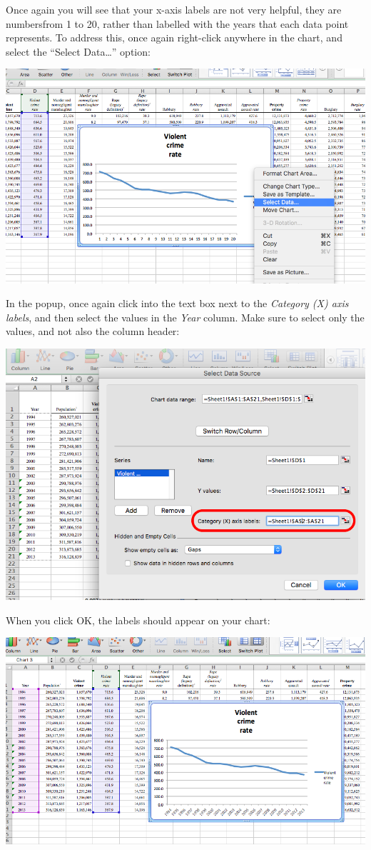 \documentclass[]{book}
\theoremstyle{definition}
\theoremstyle{definition}
\theoremstyle{definition}
\theoremstyle{remark}
\begin{document}
Once again you will see that your x-axis labels are not very helpful,
they are numbersfrom 1 to 20, rather than labelled with the years that
each data point represents. To address this, once again right-click
anywhere in the chart, and select the ``Select Data\ldots{}'' option:

\includegraphics{imgs/desc_line_2.png}

In the popup, once again click into the text box next to the
\emph{Category (X) axis labels}, and then select the values in the
\emph{Year} column. Make sure to select only the values, and not also
the column header:

\includegraphics{imgs/desc_viz_4.png}

When you click OK, the labels should appear on your chart:

\includegraphics{imgs/desc_line_3.png}
\end{document}
